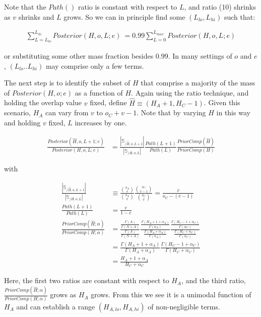 \documentclass{article}
\begin{document}
Note that the $Path()$ ratio is constant with respect to $L$, and
ratio (10) shrinks as $v$ shrinks and $L$ grows. So we can in
principle find some $(L_{lo},L_{hi})$ such that:

\begin{align}
  \sum_{L = L_{lo}}^{L_{hi}} Posterior(H,o,L;e) \>= 0.99 \sum_{L =
    0}^{L_{max}} Posterior(H,o,L;e)
\end{align}

or substituting some other mass fraction besides $0.99$. In many
settings of $o$ and $e$, $(L_{lo} .. L_{hi})$ may comprise only a few
terms.

The next step is to identify the subset of $H$ that comprise a
majority of the mass of $Posterior(H,o;e)$ as a function of $H$. Again
using the ratio technique, and holding the overlap value $v$ fixed,
define $\hat{H} \equiv (H_A + 1, H_C -1)$.  Given this scenario, $H_A$
can vary from $v$ to $o_C + v - 1$. Note that by varying $H$ in this
way and holding $v$ fixed, $L$ increases by one.

\begin{align}
  \frac{Posterior(\hat{H},o,L+1;e)}{Posterior(H,o,L;e)} & =
  \frac{|\mathbb{S}_{/\hat{H},o,L+1}|}{|\mathbb{S}_{/H,o,L}|}
  \frac{Path(L+1)}{Path(L)}
  \frac{PriorComp(\hat{H})}{PriorComp(H)} \nonumber  
\end{align}

with

\begin{align}
  \frac{|\mathbb{S}_{/\hat{H},o,L+1}|}{|\mathbb{S}_{/H,o,L}|}
  & \equiv
  \frac{{o_A \choose v}}{{o_A \choose v}}
  \frac{{o_C \choose {\bar{v}-1}}}{{o_C \choose \bar{v}}}
  =
  \frac{\bar{v}}{o_C - (\bar{v} - 1)} \\[3ex]
  \frac{Path(L+1)}{Path(L)}
  & =
  \frac{e}{1 - e} \\[3ex]
  \frac{PriorComp(\hat{H};\alpha)}{PriorComp(H;\alpha)} & =
  \frac{\frac{\Gamma(A)}{\Gamma(N+A)}}{\frac{\Gamma(A)}{\Gamma(N+A)}}
  \frac{ \frac{\Gamma(H_A+1+\alpha_A)}{\Gamma(\alpha_A)}}{
    \frac{\Gamma(H_A+\alpha_A)}{\Gamma(\alpha_A)} } \frac{
    \frac{\Gamma(H_C-1+\alpha_C)}{\Gamma(\alpha_C)} }{
    \frac{\Gamma(H_C+\alpha_C)}{\Gamma(\alpha_C)} } \nonumber \\[2ex]
  & =
  \frac{\Gamma(H_A + 1 + \alpha_A)}{\Gamma(H_A + \alpha_A)}
  \frac{\Gamma(H_C - 1 + \alpha_C)}{\Gamma(H_C + \alpha_C)} \nonumber \\[2ex]
  & =
  \frac{H_A + 1 + \alpha_A}{H_C + \alpha_C}
\end{align}

Here, the first two ratios are constant with respect to $H_A$, and the
third ratio, $\frac{PriorComp(\hat{H};\alpha)}{PriorComp(H;\alpha)}$
grows as $H_A$ grows. From this we see it is a unimodal function of
$H_A$ and can establish a range $(H_{A,lo},H_{A,hi})$ of
non-negligible terms.
\end{document}
